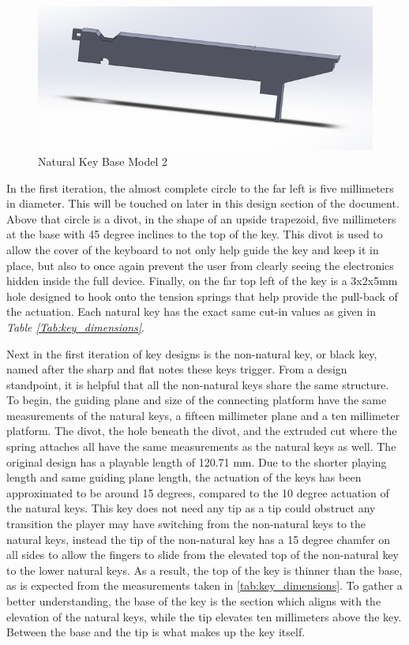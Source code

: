 \begin{figure}[h!]
  \centering
  \includegraphics[width=0.8\linewidth]{image/WhiteModel2.png}
  \caption{Natural Key Base Model 2}
  \label{fig:white_model2}
\end{figure}

In the first iteration, the almost complete circle to the far left is five millimeters in diameter. This will be touched on later in this design section of the document. Above that circle is a divot, in the shape of an upside trapezoid, five millimeters at the base with 45 degree inclines to the top of the key. This divot is used to allow the cover of the keyboard to not only help guide the key and keep it in place, but also to once again prevent the user from clearly seeing the electronics hidden inside the full device. Finally, on the far top left of the key is a 3x2x5mm hole designed to hook onto the tension springs that help provide the pull-back of the actuation. Each natural key has the exact same cut-in values as given in \textit{Table \ref{Tab:key_dimensions}}.

Next in the first iteration of key designs is the non-natural key, or black key, named after the sharp and flat notes these keys trigger. From a design standpoint, it is helpful that all the non-natural keys share the same structure. To begin, the guiding plane and size of the connecting platform have the same measurements of the natural keys, a fifteen millimeter plane and a ten millimeter platform. The divot, the hole beneath the divot, and the extruded cut where the spring attaches all have the same measurements as the natural keys as well. The original design has a playable length of 120.71 mm. Due to the shorter playing length and same guiding plane length, the actuation of the keys has been approximated to be around 15 degrees, compared to the 10 degree actuation of the natural keys. This key does not need any tip as a tip could obstruct any transition the player may have switching from the non-natural keys to the natural keys, instead the tip of the non-natural key has a 15 degree chamfer on all sides to allow the fingers to slide from the elevated top of the non-natural key to the lower natural keys. As a result, the top of the key is thinner than the base, as is expected from the measurements taken in \autoref{tab:key_dimensions}. To gather a better understanding, the base of the key is the section which aligns with the elevation of the natural keys, while the tip elevates ten millimeters above the key. Between the base and the tip is what makes up the key itself.

